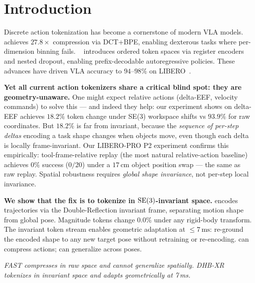 \section{Introduction}
\label{sec:intro}

Discrete action tokenization has become a cornerstone of modern VLA models.
\fast{}~\cite{fast2025} achieves $27.8\times$ compression via DCT+BPE,
enabling dexterous tasks where per-dimension binning fails.
\oat{}~\cite{oat2026} introduces ordered token spaces via register encoders and
nested dropout, enabling prefix-decodable autoregressive policies.
These advances have driven VLA accuracy to $94$--$98\%$ on LIBERO~\cite{libero2023}.

\textbf{Yet all current action tokenizers share a critical blind spot: they are
geometry-unaware.}
One might expect relative actions (delta-EEF, velocity commands) to solve this ---
and indeed they help: our experiment shows \fast{} on delta-EEF achieves $18.2\%$
token change under SE(3) workspace shifts vs $93.9\%$ for raw coordinates.
But $18.2\%$ is far from invariant, because the \emph{sequence of per-step deltas}
encoding a task shape changes when objects move, even though each delta is locally
frame-invariant.
Our LIBERO-PRO P2 experiment confirms this empirically: tool-frame-relative replay
(the most natural relative-action baseline) achieves $0\%$ success ($0/20$) under
a $17\,\text{cm}$ object position swap --- the same as raw replay.
Spatial robustness requires \emph{global shape invariance}, not per-step local invariance.

\textbf{We show that the fix is to tokenize in $\mathrm{SE}(3)$-invariant space.}
\dhb{} encodes trajectories via the Double-Reflection invariant frame,
separating motion shape from global pose.
Magnitude tokens change $0.0\%$ under any rigid-body transform.
The invariant token stream enables geometric adaptation at $\leq\!7\,\text{ms}$:
re-ground the encoded shape to any new target pose without retraining or re-encoding.
\fast{} can compress actions; \dhb{} can generalize across poses.

\textit{FAST compresses in raw space and cannot generalize spatially.
DHB-XR tokenizes in invariant space and adapts geometrically at 7\,ms.}

